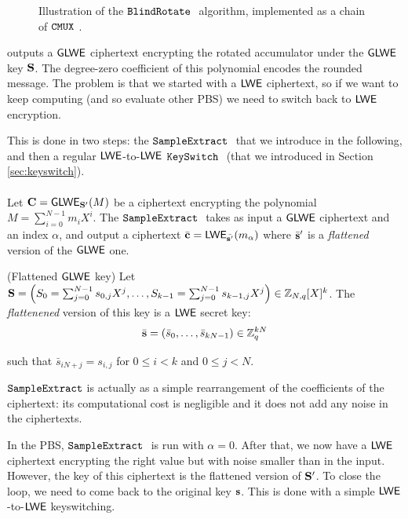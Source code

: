 

\begin{figure}
	\centering
	\blindRotatePicture
	\caption{Illustration of the $\texttt{BlindRotate}~$ algorithm, implemented as a chain of $\texttt{CMUX}~$.}
	\label{fig:cmux_chain}
\end{figure}


\BlindRotate outputs a $\textsf{GLWE}$ ciphertext encrypting the rotated accumulator under the $\textsf{GLWE}$ key $\mathbf S$. The degree-zero coefficient of this polynomial encodes the rounded message. The problem is that we started with a $\textsf{LWE}$ ciphertext, so if we want to keep computing (and so evaluate other PBS) we need to switch back to $\textsf{LWE}$ encryption.


This is done in two steps: the $\texttt{SampleExtract}~$ that we introduce in the following, and then a regular $\textsf{LWE}$-to-$\textsf{LWE}$ $\texttt{KeySwitch}~$ (that we introduced in Section \ref{sec:keyswitch}).


\paragraph{\SampleExtract}
Let $\mathbf C = \textsf{GLWE}_{\mathbf S'}(M)$ be a ciphertext encrypting the polynomial $M = \sum_{i=0}^{N-1} m_i X^i$. The $\texttt{SampleExtract}~$ takes as input a $\textsf{GLWE}$ ciphertext and an index $\alpha$, and output a ciphertext $\bar{\mathbf c} = \textsf{LWE}_{\bar{\mathbf s'}}(m_\alpha)$ where $\bar {\mathbf s}'$ is a \textit{flattened} version of the $\textsf{GLWE}$ one. 

\begin{definition} (Flattened $\textsf{GLWE}$ key)
	Let $\mathbf S = \left ( S_0 = \sum_{j=0}^{N-1} s_{0, j} X^j, \dots,  S_{k-1} = \sum_{j=0}^{N-1} s_{k-1, j} X^j\right ) \in \mathbb{Z}_{N,q}[X]^k$. The \textit{flattenened} version of this key is a $\textsf{LWE}$ secret key:
	\[
		\bar{\mathbf s} =  (\bar s_0, \dots, \bar s_{kN-1}) \in \mathbb{Z}_q^{kN}
	\] 
	
	such that $\bar s_{iN + j} = s_{i, j}$ for $0 \le i < k$ and $0 \le j < N$.
\end{definition}

$\texttt{SampleExtract}~$is actually as a simple rearrangement of the coefficients of the ciphertext: its computational cost is negligible and it does not add any noise in the ciphertexts.






In the PBS, $\texttt{SampleExtract}~$ is run with $\alpha = 0$. After that, we now have a $\textsf{LWE}$ ciphertext encrypting the right value but with noise smaller than in the input. However, the key of this ciphertext is the flattened version of $\mathbf S'$. To close the loop, we need to come back to the original key $\mathbf s$. This is done with a simple $\textsf{LWE}$-to-$\textsf{LWE}$ keyswitching.



